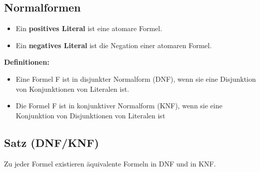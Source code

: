 \documentclass{article}
\begin{document}
\begin{itemize}
		\subsection{Normalformen}
		\begin{itemize}
			\item Ein \textbf{positives Literal} ist eine atomare Formel.
			\item Ein \textbf{negatives Literal} ist die Negation einer atomaren Formel.
		\end{itemize} 
		\textbf{Definitionen:}
		\begin{itemize}
			\item Eine Formel F ist in disjunkter Normalform (DNF), wenn sie eine Disjunktion von Konjunktionen von Literalen ist.
			\item Die Formel F ist in konjunktiver Normalform (KNF), wenn sie eine Konjunktion von Disjunktionen von Literalen ist
		\end{itemize}
		\subsection{Satz (DNF/KNF)}
		Zu jeder Formel existieren äquivalente Formeln in DNF und in KNF.

\end{itemize}
\end{document}
